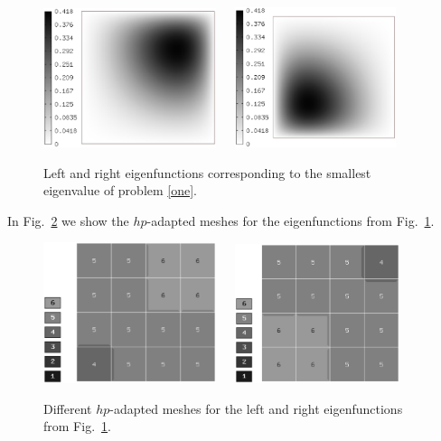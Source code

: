 \documentclass[smallextended]{svjour3}
\begin{document}
\begin{figure}[!ht]
\begin{center}
\includegraphics[width=0.45\textwidth]{eig1.eps}\ \ \ 
\includegraphics[width=0.42\textwidth]{eig2.eps}\\
\end{center}
\caption{Left and right eigenfunctions corresponding to the smallest eigenvalue of problem \eqref{one}. }
\label{fig:eigen1}
\end{figure}
\noindent
In Fig.~\ref{fig:mesh1} we show the $hp$-adapted meshes for the eigenfunctions from Fig.~\ref{fig:eigen1}.
\newpage

\begin{figure}[!ht]
\begin{center}
\includegraphics[width=0.45\textwidth]{mesh1.eps}\ \ \ 
\includegraphics[width=0.43\textwidth]{mesh2.eps}\\
\end{center}
\caption{Different $hp$-adapted meshes for the left and right eigenfunctions from Fig.~\ref{fig:eigen1}. }
\label{fig:mesh1}
\end{figure}
\end{document}
